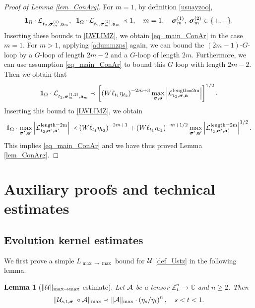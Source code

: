 \documentclass[10pt,reqno]{article}
\theoremstyle{plain} %
\newtheorem{lemma}[theorem]{Lemma}
\theoremstyle{remark}
\numberwithin{equation}{section}
\begin{document}
\begin{proof}[Proof of Lemma \ref{lem_ConArg}]
For  $m=1$, by definition \eqref{usuayzoo}, 
\[
      {\bf 1}_{\Omega}\cdot  \mathcal{L}_{t_2, \boldsymbol{\sigma}_m^{(1)}, \textbf{a}_m},\; \;
         {\bf 1}_{\Omega}\cdot \mathcal{L}_{t_2, \boldsymbol{\sigma}_m^{(2)}, \textbf{a}_m}
    \prec 1, \quad m=1,\quad \boldsymbol{\sigma}_m^{(1)}, \;\boldsymbol{\sigma}_m^{(2)}\in\{+,-\}.
\]
Inserting  these bounds  to \eqref{LWLIMZ}, we obtain \eqref{eq_main_ConAr} in the case $m=1$.  
For $m>1$,  applying \eqref{adummzps} again,  we can bound the $(2m-1)$-$G$-loop by a $G$-loop of length $2m-2$ and a $G$-loop of length $2m$. Furthermore, we can use assumption \eqref{eq_main_ConAr} to  bound this  $G$ loop with length $2m-2$. Then we obtain that 
$$
   {\bf 1}_{\Omega}\cdot  \mathcal{L}_{t_2, \boldsymbol{\sigma}_m^{(1,2)}, \textbf{a}_m} \prec \left[ \left( W \ell_{t_1} \eta_{t_2} \right)^{-2m+3} \max_{\boldsymbol{\sigma} , \textbf{a} } \left| \mathcal{L}^{\text{length=2m}}_{t_2, \boldsymbol{\sigma} , \textbf{a} } \right| \right]^{1/2}.
    $$
Inserting  this bound to \eqref{LWLIMZ}, we obtain 
$$
      {\bf 1}_{\Omega}\cdot\max_{\boldsymbol{\sigma}' , \textbf{a}' } \left| \mathcal{L}^{\text{length=2m}}_{t_2, \boldsymbol{\sigma}' , \textbf{a}' } \right|
    \prec \left( W \ell_{t_1} \eta_{t_2} \right)^{-2m+1 } 
    +\left( W \ell_{t_1} \eta_{t_2} \right)^{-m+1/2}
     \max_{\boldsymbol{\sigma}' , \textbf{a}' } \left| \mathcal{L}^{\text{length=2m}}_{t_2, \boldsymbol{\sigma}' , \textbf{a}' } \right|^{1/2}. 
$$
This  implies  \eqref{eq_main_ConAr} and we have thus proved  Lemma \ref{lem_ConArg}.
\end{proof}
 

\section{Auxiliary proofs and technical estimates}

\subsection{Evolution kernel estimates}\label{ks}

We first prove a simple $L_{\max\to \max}$ bound  for $\cal U$ \ref{def_Ustz} in the following lemma. 

\begin{lemma}[$\|{\cal U}\|_{\max\to \max}$ estimate]\label{lem:sum_Ndecay}
Let $\cal A$ be a tensor $\mathbb Z_L^n\to \mathbb C$ and $n\ge 2$.  
Then 
\begin{align}\label{sum_res_Ndecay}
   \| {\cal U}_{s,t,\boldsymbol{\sigma}}\;\circ {\cal A}\|_{\max } \prec \|{\cal A}\|_{\max}
    \cdot \left(  \eta_s/ \eta_t\right)^{n } ,\quad s<t<1. 
\end{align}
\end{lemma}
 
\end{document}
